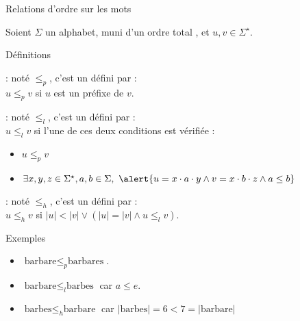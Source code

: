 
\begingroup

\begin{frame}{Relations d'ordre sur les mots}

  Soient $\Sigma$ un alphabet, muni d'un ordre total \structure{$\le$}, et $u, v \in \Sigma^\star$.

  \begin{block}{Définitions}
    \begin{description}
    \item[Ordre préfixiel]: noté \alert{$\le_p$}, c'est un  défini par : \\
      \alert{$u \le_p v$} si \alert{$u$ est un préfixe de $v$}.
 
    \item[Ordre lexicographique]: noté \alert{$\le_l$}, c'est un  défini par :\\
       \alert{$u \le_l v$} si l'une de ces deux conditions est vérifiée :
        \begin{itemize}
        \item \alert{$u \le_p v$}
        \item $\exists x, y, z \in \Sigma^\star, a, b \in \Sigma,~ \alert{u = x\cdot a\cdot y \land v = x\cdot b\cdot z \land a \le b}$
        \end{itemize}

    \item[Ordre hiérarchique]: noté \alert{$\le_h$}, c'est un  défini par :\\
      \alert{$u \le_h v$} si \alert{$|u| < |v| \lor (|u| = |v| \land u \le_l v)$}.
    \end{description}
  \end{block}

  \begin{exampleblock}{Exemples}
    \begin{itemize}
      \item $\text{barbare} \le_p \text{barbares}$. 
      \item $\text{barbare} \le_l \text{barbes}$ car $a \le e$. 
      \item $\text{barbes} \le_h \text{barbare}$ car $|\text{barbes}| = 6 < 7 = |\text{barbare}|$
    \end{itemize}
  \end{exampleblock}
  
\end{frame}

\endgroup

